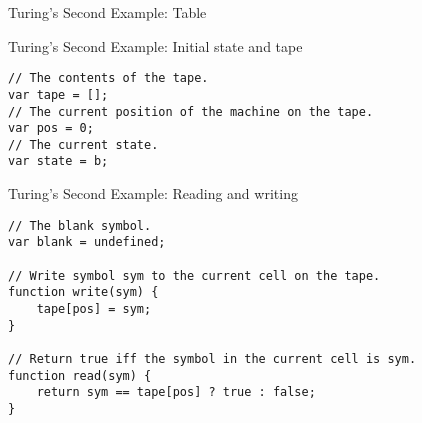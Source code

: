 \documentclass[dvipsnames, hidelinks]{beamer}
\begin{document}
\begin{frame}{Turing's Second Example: Table}
  \begin{table}
  \end{table}
\end{frame}


\begin{frame}[fragile]{Turing's Second Example: Initial state and tape}
\begin{verbatim}
// The contents of the tape.
var tape = [];
// The current position of the machine on the tape.
var pos = 0;
// The current state.
var state = b;
\end{verbatim}
\end{frame}

\begin{frame}[fragile]{Turing's Second Example: Reading and writing}
\begin{verbatim}
// The blank symbol.
var blank = undefined;

// Write symbol sym to the current cell on the tape.
function write(sym) {
	tape[pos] = sym;
}

// Return true iff the symbol in the current cell is sym.
function read(sym) {
	return sym == tape[pos] ? true : false;
}
\end{verbatim}
\end{frame}
\end{document}

